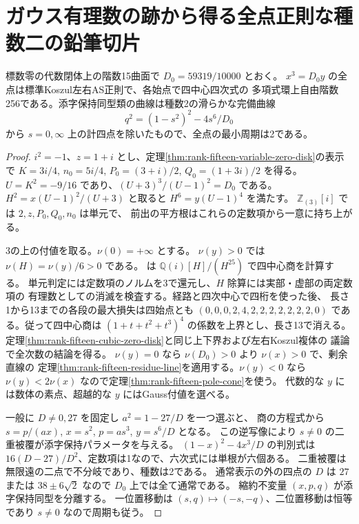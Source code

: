 \section{ガウス有理数の跡から得る全点正則な種数二の鉛筆切片}
\label{sec:rank-fifteen-gaussian-pencil}
\begin{theorem}\label{thm:rank-fifteen-gaussian-pencil}
標数零の代数閉体上の階数15曲面で $D_0=59319/10000$ とおく。
$x^3=D_0y$ の全点は標準Koszul左右AS正則で、各始点で四中心四次式の
多項式環上自由階数256である。添字保持同型類の曲線は種数2の滑らかな完備曲線
\[
                 q^2=(1-s^2)^2-4s^6/D_0
\]
から $s=0,\infty$ 上の計四点を除いたもので、全点の最小周期は2である。
\end{theorem}
\begin{proof}
$i^2=-1$、$z=1+i$ とし、定理\ref{thm:rank-fifteen-variable-zero-disk}の表示で
$K=3i/4$, $n_0=5i/4$, $P_0=(3+i)/2$, $Q_0=(1+3i)/2$ を得る。
$U=K^2=-9/16$ であり、$(U+3)^3/(U-1)^2=D_0$ である。
$H^2=x(U-1)^2/(U+3)$ と取ると $H^6=y(U-1)^4$ を満たす。
$\mathbb Z_{(3)}[i]$ では $2,z,P_0,Q_0,n_0$ は単元で、
前出の平方根はこれらの定数項から一意に持ち上がる。

3の上の付値を取る。$\nu(0)=+\infty$ とする。
$\nu(y)>0$ では $\nu(H)=\nu(y)/6>0$ である。
 は
$\mathbb Q(i)[H]/(H^{25})$ で四中心商を計算する。
単元判定には定数項のノルムを3で還元し、$H$ 除算には実部・虚部の両定数項の
有理数としての消滅を検査する。経路と四次中心で四桁を使った後、
長さ1から13までの各段の最大損失は四始点とも
$(0,0,0,2,4,2,2,2,2,2,2,2,0)$ である。従って四中心商は
$(1+t+t^2+t^3)^4$ の係数を上界とし、長さ13で消える。
定理\ref{thm:rank-fifteen-cubic-zero-disk}と同じ上下界および左右Koszul複体の
議論で全次数の結論を得る。
$\nu(y)=0$ なら $\nu(D_0)>0$ より $\nu(x)>0$ で、剰余直線の
定理\ref{thm:rank-fifteen-residue-line}を適用する。$\nu(y)<0$ なら
$\nu(y)<2\nu(x)$ なので定理\ref{thm:rank-fifteen-pole-cone}を使う。
代数的な $y$ には数体の素点、超越的な $y$ にはGauss付値を選べる。

一般に $D\ne0,27$ を固定し $a^2=1-27/D$ を一つ選ぶと、
商の方程式から $s=p/(ax)$, $x=s^2$, $p=as^3$, $y=s^6/D$ となる。
この逆写像により $s\ne0$ の二重被覆が添字保持パラメータを与える。
$(1-x)^2-4x^3/D$ の判別式は $16(D-27)/D^2$、定数項は1なので、六次式には単根が六個ある。
二重被覆は無限遠の二点で不分岐であり、種数は2である。
通常表示の外の四点の $D$ は $27$ または $38\pm6\sqrt2$ なので $D_0$ 上では全て通常である。
縮約不変量 $(x,p,q)$ が添字保持同型を分離する。
一位置移動は $(s,q)\mapsto(-s,-q)$、二位置移動は恒等であり $s\ne0$ なので周期も従う。
\end{proof}

